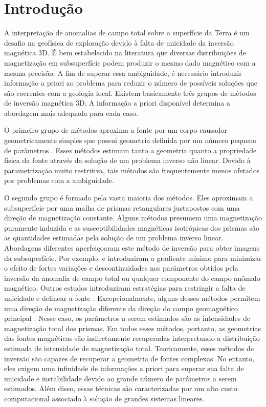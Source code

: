 \chapter{Introdução}

A interpretação de anomalias de campo total sobre a superfície da Terra é um desafio na geofísica de exploração devido à falta de unicidade da inversão magnética 3D. É bem estabelecido na literatura que diversas distribuições de magnetização em subsuperfície podem produzir o mesmo dado magnético com a mesma precisão. A fim de superar essa ambiguidade, é necessário introduzir informação a priori ao problema para reduzir o número de possíveis soluções que são coerentes com a geologia local. Existem basicamente três grupos de métodos de inversão magnética 3D. A informação a priori disponível determina a abordagem mais adequada para cada caso.

O primeiro grupo de métodos aproxima a fonte por um corpo causador geometricamente simples que possui geometria definida por um número pequeno de parâmetros \cite[por exemplo, ][]{ballantyne-1980,bhattacharyya-1980,silva_hohmann1983}. Esses métodos estimam tanto a geometria quanto a propriedade física da fonte através da solução de um problema inverso não linear. Devido à parametrização muito restritiva, tais métodos são frequentemente menos afetados por problemas com a ambiguidade.

O segundo grupo é formado pela vasta maioria dos métodos. Eles aproximam a subsuperfície por uma malha de prismas retangulares justapostos com uma direção de magnetização constante.
Alguns métodos presumem uma magnetização puramente induzida \cite[por exemplo, ][]{cribb-1976,li_3-d_1996,pilkington_3-d_1997} e as susceptibilidades magnéticas isotrópicas dos prismas são as quantidades estimadas pela solução de um problema inverso linear.
Abordagens diferentes aperfeiçoaram este método de inversão para obter imagens da subsuperfície.
Por exemplo, \cite{portniaguine_focusing_1999} e \cite{portniaguine_3d_2002} introduziram o gradiente mínimo para minimizar o efeito de fortes variações e descontinuidades nos parâmetros obtidos pela inversão da anomalia de campo total ou qualquer componente do campo anômalo magnético.
Outros estudos introduziram estratégias para restringir a falta de unicidade e delinear a fonte \cite[]{tontini,pilkington_3d_2009,shamsipour_3d_2011,cella_inversion_2012,abedi-2015}. Excepcionalmente, alguns desses métodos permitem uma direção de magnetização diferente da direção do campo geomagnético principal \cite[por exemplo, ][]{pignatelli-2006}. Nesse caso, os parâmetros a serem estimados são as intensidades de magnetização total dos prismas. Em todos esses métodos, portanto, as geometrias das fontes magnéticas são indiretamente recuperadas interpretando a distribuição estimada de intensidade de magnetização total. Teoricamente, esses métodos de inversão são capazes de recuperar a geometria de fontes complexas. No entanto, eles exigem uma infinidade de informações a priori para superar sua falta de unicidade e instabilidade devido ao grande número de parâmetros a serem estimados. Além disso, essas técnicas são caracterizadas por um alto custo computacional associado à solução de grandes sistemas lineares.

